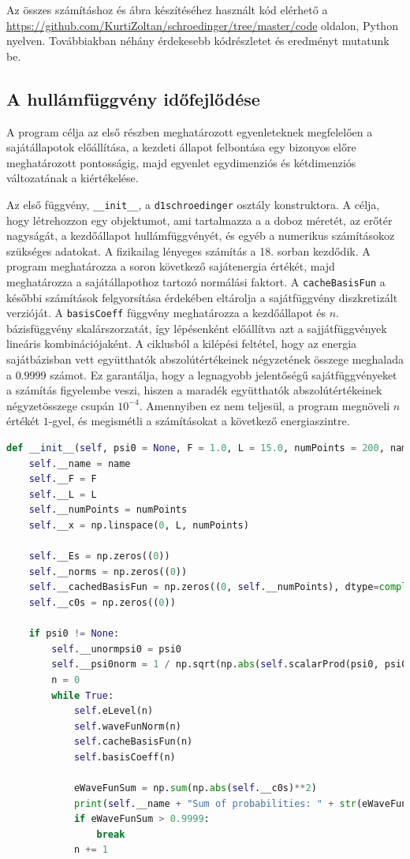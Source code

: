 Az összes számításhoz és ábra készítéséhez használt kód elérhető a \url{https://github.com/KurtiZoltan/schroedinger/tree/master/code} oldalon, Python nyelven. Továbbiakban néhány érdekesebb kódrészletet és eredményt mutatunk be.
\subsection{A hullámfüggvény időfejlődése}
\label{numeric:timesection}
A program célja az első részben meghatározott egyenleteknek megfelelően a sajátállapotok előállítása, a kezdeti állapot felbontása egy bizonyos előre meghatározott pontosságig, majd  egyenlet egydimenziós és kétdimenziós változatának a kiértékelése.

Az első függvény, \texttt{__init__}, a \texttt{d1schroedinger} osztály konstruktora. A célja, hogy létrehozzon egy objektumot, ami tartalmazza a a doboz méretét, az erőtér nagyságát, a kezdőállapot hullámfüggvényét, és egyéb a numerikus számításokoz szükséges adatokat. A fizikailag lényeges számítás a 18. sorban kezdődik. A program meghatározza a soron következő sajátenergia értékét, majd meghatározza a sajátállapothoz tartozó normálási faktort. A \texttt{cacheBasisFun} a későbbi számítások felgyorsítása érdekében eltárolja a sajátfüggvény diszkretizált verzióját. A \texttt{basisCoeff} függvény meghatározza a kezdőállapot és $n$. bázisfüggvény skalárszorzatát, így lépésenként előállítva azt a sajjátfüggvények lineáris kombinációjaként. A ciklusból a kilépési feltétel, hogy az energia sajátbázisban vett együtthatók abszolútértékeinek négyzetének összege meghalada a $0.9999$ számot. Ez garantálja, hogy a legnagyobb jelentőségű sajátfüggvényeket a számítás figyelembe veszi, hiszen a maradék együtthatók abszolútértékeinek négyzetösszege csupán $10^{-4}$. Amennyiben ez nem teljesül, a program megnöveli $n$ értékét $1$-gyel, és megismétli a számításokat a következő energiaszintre.
\begin{lstlisting}[language=Python]
def __init__(self, psi0 = None, F = 1.0, L = 15.0, numPoints = 200, name = "1D: "):
    self.__name = name
    self.__F = F
    self.__L = L
    self.__numPoints = numPoints
    self.__x = np.linspace(0, L, numPoints)
    
    self.__Es = np.zeros((0))
    self.__norms = np.zeros((0))
    self.__cachedBasisFun = np.zeros((0, self.__numPoints), dtype=complex)
    self.__c0s = np.zeros((0))
    
    if psi0 != None:
        self.__unormpsi0 = psi0
        self.__psi0norm = 1 / np.sqrt(np.abs(self.scalarProd(psi0, psi0)))
        n = 0
        while True:
            self.eLevel(n)
            self.waveFunNorm(n)
            self.cacheBasisFun(n)
            self.basisCoeff(n)
            
            eWaveFunSum = np.sum(np.abs(self.__c0s)**2)
            print(self.__name + "Sum of probabilities: " + str(eWaveFunSum))
            if eWaveFunSum > 0.9999:
                break
            n += 1
\end{lstlisting}
